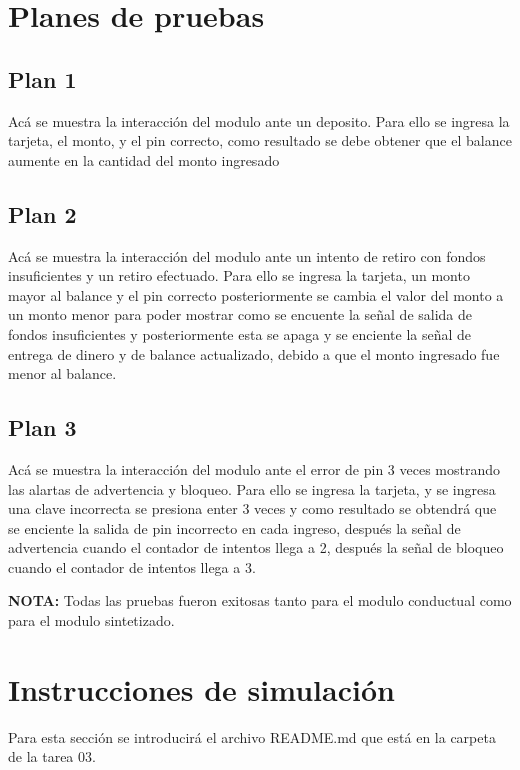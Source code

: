 \section{Planes de pruebas}
\subsection{Plan 1}
    Acá se muestra la interacción del modulo ante un deposito.
    Para ello se ingresa la tarjeta, el monto, y el pin correcto,
    como resultado se debe obtener que el balance aumente en la cantidad
    del monto ingresado 
 
    \subsection{Plan 2}
 Acá se muestra la interacción del modulo ante un intento de retiro con
 fondos insuficientes y un retiro efectuado.
 Para ello se ingresa la tarjeta, un monto mayor al balance y el pin correcto
 posteriormente se cambia el valor del monto a un monto menor para poder
 mostrar como se encuente la señal de salida de fondos insuficientes y
 posteriormente esta se apaga y se enciente la señal de entrega de dinero y de
 balance actualizado, debido a que el monto ingresado fue menor al balance.

 \subsection{Plan 3}
 Acá se muestra la interacción del modulo ante el error de pin 3 veces
 mostrando las alartas de advertencia y bloqueo.
Para ello se ingresa la tarjeta, y se ingresa una clave incorrecta
se presiona enter 3 veces y como resultado se obtendrá
que se enciente la salida de pin incorrecto en cada ingreso,
 después la señal de advertencia cuando el contador de intentos llega a 2,
 después la señal de bloqueo cuando el contador de intentos llega a 3.


 \textbf{NOTA:} Todas las pruebas fueron exitosas tanto para el modulo
 conductual como para el modulo sintetizado.

 \section{Instrucciones de simulación}

 Para esta sección se introducirá el archivo README.md que está en la carpeta
 de la tarea 03.

